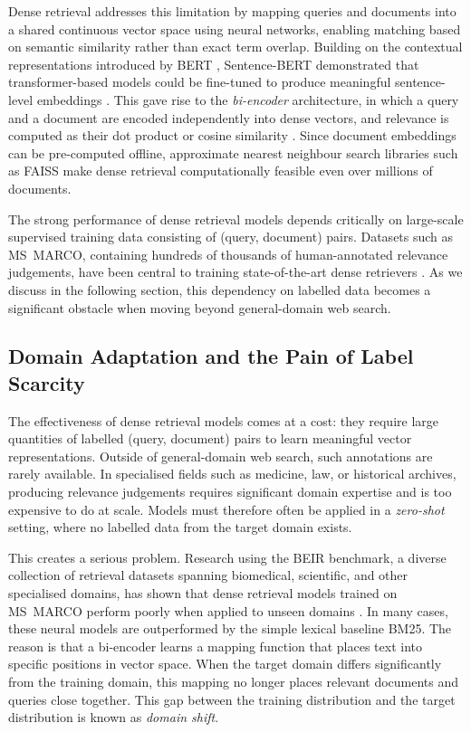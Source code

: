 \documentclass[thesis]{cluu}
\begin{document}
Dense retrieval addresses this limitation by mapping queries and 
documents into a shared continuous vector space using neural networks, 
enabling matching based on semantic similarity rather than exact term 
overlap. Building on the contextual representations introduced by BERT 
\parencite{devlin-etal-2019-bert}, Sentence-BERT demonstrated that 
transformer-based models could be fine-tuned to produce meaningful 
sentence-level embeddings \parencite{reimers2019sentence}. This gave 
rise to the \textit{bi-encoder} architecture, in which a query and a 
document are encoded independently into dense vectors, and relevance 
is computed as their dot product or cosine similarity 
\parencite{karpukhin2020dense}. Since document embeddings can be 
pre-computed offline, approximate nearest neighbour search libraries 
such as FAISS \parencite{johnson2019billion} make dense retrieval 
computationally feasible even over millions of documents.

The strong performance of dense retrieval models depends critically 
on large-scale supervised training data consisting of 
(query, document) pairs. Datasets such as MS~MARCO, 
containing hundreds of thousands of human-annotated relevance 
judgements, have been central to training state-of-the-art dense 
retrievers \parencite{bajaj2016ms}. As we discuss in the following 
section, this dependency on labelled data becomes a significant 
obstacle when moving beyond general-domain web search.

\subsection{Domain Adaptation and the Pain of Label Scarcity}

The effectiveness of dense retrieval models comes at a cost: they 
require large quantities of labelled (query, document) pairs 
to learn meaningful vector representations. Outside of general-domain 
web search, such annotations are rarely available. In specialised 
fields such as medicine, law, or historical archives, producing 
relevance judgements requires significant domain expertise and is 
too expensive to do at scale. Models must therefore often be applied in 
a \textit{zero-shot} setting, where no labelled data from the target 
domain exists.

This creates a serious problem. Research using the BEIR benchmark, a 
diverse collection of retrieval datasets spanning biomedical, 
scientific, and other specialised domains, has shown that dense 
retrieval models trained on MS~MARCO perform poorly when applied to 
unseen domains \parencite{thakur2021beir}. In many cases, these 
neural models are outperformed by the simple lexical baseline BM25. 
The reason is that a bi-encoder learns a mapping function that places 
text into specific positions in vector space. When the target domain 
differs significantly from the training domain, this mapping no longer 
places relevant documents and queries close together. This gap between 
the training distribution and the target distribution is known as 
\textit{domain shift}.
\end{document}
